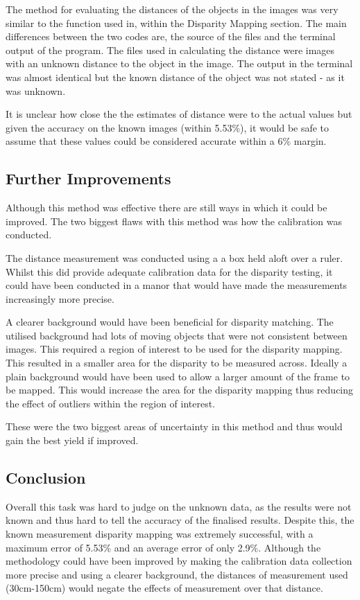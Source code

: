 \documentclass[conference]{IEEEtran}
\begin{document}
The method for evaluating the distances of the objects in the images was very similar to the function used in,  within the Disparity Mapping section. The main differences between the two codes are, the source of the files and the terminal output of the program. The files used in calculating the distance were images with an unknown distance to the object in the image. The output in the terminal was almost identical but the known distance of the object was not stated - as it was unknown. 

It is unclear how close the  the estimates of distance were to the actual values but given the accuracy on the known images (within 5.53\%), it would be safe to assume that these values could be considered accurate within a 6\% margin.

\subsection{Further Improvements}

Although this method was effective there are still ways in which it could be improved. The two biggest flaws with this method was how the calibration was conducted.

The distance measurement was conducted using a a box held aloft over a ruler. Whilst this did provide adequate calibration data for the disparity testing, it could have been conducted in a manor that would have made the measurements increasingly more precise. 

A clearer background would have been beneficial for disparity matching. The utilised background had lots of moving objects that were not consistent between images. This required a region of interest to be used for the disparity mapping. This resulted in a smaller area for the disparity to be measured across. Ideally a plain background would have been used to allow a larger amount of the frame to be mapped. This would increase the area for the disparity mapping thus reducing the effect of outliers within the region of interest. 

These were the two biggest areas of uncertainty in this method and thus would gain the best yield if improved.

\subsection{Conclusion}
Overall this task was hard to judge on the unknown data, as the results were not known and thus hard to tell the accuracy of the finalised results. Despite this, the known measurement disparity mapping was extremely successful, with a maximum error of 5.53\% and an average error of only 2.9\%. Although the methodology could have been improved by making the calibration data collection more precise and using a clearer background, the distances of measurement used (30cm-150cm) would negate the effects of measurement over that distance. 
\end{document}
